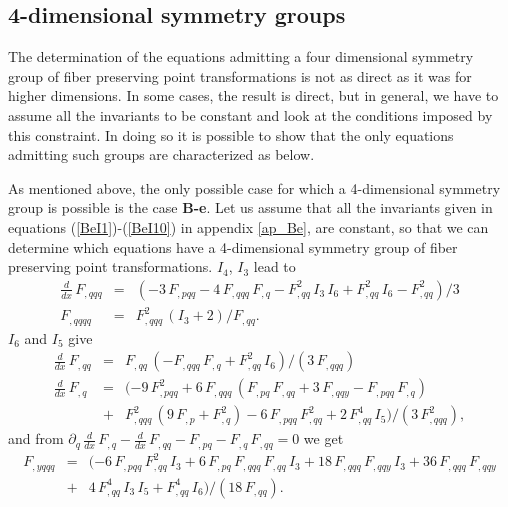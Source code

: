 %

\subsection{4-dimensional symmetry groups}
The determination of the equations admitting a four dimensional 
symmetry group of fiber preserving point transformations is not as direct as  
it was for higher dimensions. In some cases, the result is direct, but  
in general, we have to assume all the invariants to be constant and look at  
the conditions imposed by this constraint. In doing so it is possible to 
show that the only equations admitting such groups are characterized as below.
%

As mentioned above, the only possible case for which a 4-dimensional symmetry 
group is possible is the case {\bf B-e}.
%
Let us assume that all the invariants given in equations 
(\ref{BeI1})-(\ref{BeI10}) in appendix \ref{ap_Be}, are constant, 
so that we can determine 
which equations have a 4-dimensional symmetry group of fiber preserving 
point transformations. $I_{4}$, $I_{3}$ lead to
\begin{eqnarray}
\frac{d}{dx}\,F_{,qqq}
&=&( - 3\,F_{,pqq} - 4\,F_{,qqq}\,F_{,q} - F_{,qq}^{2}\,I_{3}\,I_{6} 
+ F_{,qq}^{2}\,I_{6} - F_{,qq}^{2})/3 \\
%
F_{,qqqq}&=&F_{,qqq}^{2}\,(I_{3} + 2)/F_{,qq}.
\end{eqnarray}
$I_{6}$ and $I_{5}$ give
\begin{eqnarray}
\frac{d}{dx}\,F_{,qq}
&=&F_{,qq}\,( - F_{,qqq}\,F_{,q} + F_{,qq}^{2}\,I_{6})/(3\,F_{,qqq}) \\
%
\frac{d}{dx}\,F_{,q}&=&( - 9\,F_{,pqq}^{2} 
+ 6\,F_{,qqq}\,(F_{,pq}\,F_{,qq} + 3\,F_{,qqy} - F_{,pqq}\,F_{,q}) \nonumber \\
&+& F_{,qqq}^{2}\,(9\,F_{,p} + F_{,q}^{2}) - 6\,F_{,pqq}\,F_{,qq}^{2} 
+ 2\,F_{,qq}^{4}\,I_{5})/(3\,F_{,qqq}^{2}),
\end{eqnarray}
and from 
\mbox{$\partial_{q}\,\frac{d}{dx}\,F_{,q}-\frac{d}{dx}\,F_{,qq}
-F_{,pq}-F_{,q}\,F_{,qq}=0$} we get
\begin{eqnarray}
F_{,yqqq}&=&( - 6\,F_{,pqq}\,F_{,qq}^{2}\,I_{3} 
+ 6\,F_{,pq}\,F_{,qqq}\,F_{,qq}\,I_{3} + 18\,F_{,qqq}\,F_{,qqy}\,I_{3} 
+ 36\,F_{,qqq}\,F_{,qqy} \nonumber \\
&+& 4\,F_{,qq}^{4}\,I_{3}\,I_{5} + F_{,qq}^{4}\,I_{6})/(18\,F_{,qq}).
\end{eqnarray}
